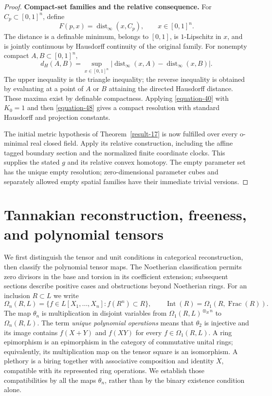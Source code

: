 \documentclass[11pt,a4paper]{article}
\theoremstyle{definition}
\begin{document}
\begin{proof}
\textbf{Compact-set families and the relative consequence.}
For \(C_p\subset[0,1]^n\), define
\[
 F(p,x)=\operatorname{dist}_\infty(x,C_p),
 \qquad x\in[0,1]^n.
\]
The distance is a definable minimum, belongs to \([0,1]\), is
\(1\)-Lipschitz in \(x\), and is jointly continuous by Hausdorff
continuity of the original family. For nonempty compact
\(A,B\subset[0,1]^n\),
\begin{equation}
 d_H(A,B)=
 \sup_{x\in[0,1]^n}
 |\operatorname{dist}_\infty(x,A)
             -\operatorname{dist}_\infty(x,B)|.
 \label{equation-48}
\end{equation}
The upper inequality is the triangle inequality; the reverse
inequality is obtained by evaluating at a point of \(A\) or
\(B\) attaining the directed Hausdorff distance. These
maxima exist by definable compactness. Applying \eqref{equation-40} with
\(K_0=1\) and then \eqref{equation-48} gives a compact resolution with
standard Hausdorff and projection constants.

The initial metric hypothesis of Theorem~\ref{result-17} is now fulfilled over
every o-minimal real closed field. Apply its relative
construction, including the affine tagged boundary section
and the normalized finite coordinate clocks. This supplies
the stated \(g\) and its relative convex homotopy. The empty
parameter set has the unique empty resolution; zero-dimensional
parameter cubes and separately allowed empty spatial families
have their immediate trivial versions.
\end{proof}





\part{Tannakian reconstruction, freeness, and polynomial tensors}
We first distinguish the tensor and unit conditions in categorical
reconstruction, then classify the polynomial tensor maps. The
Noetherian classification permits zero divisors in the base and
torsion in its coefficient extension; subsequent sections describe
positive cases and obstructions beyond Noetherian rings. For an
inclusion $R\subset L$ we write
\[
 \Omega_n(R,L)=\{f\in L[X_1,\ldots,X_n]:f(R^n)\subset R\},
 \qquad \operatorname{Int}(R)=\Omega_1(R,\operatorname{Frac}(R)).
\]
The map $\theta_n$ is multiplication in disjoint variables from
$\Omega_1(R,L)^{\otimes_R n}$ to $\Omega_n(R,L)$. The term
\emph{unique polynomial operations} means that $\theta_2$ is injective
and its image contains $f(X+Y)$ and $f(XY)$ for every $f\in\Omega_1(R,L)$.
A ring epimorphism is an epimorphism in the category of commutative
unital rings; equivalently, its multiplication map on the tensor square
is an isomorphism. A plethory is a biring together with associative
composition and identity $X$, compatible with its represented ring
operations. We establish those compatibilities by all the maps
$\theta_n$, rather than by the binary existence condition alone.
\end{document}
